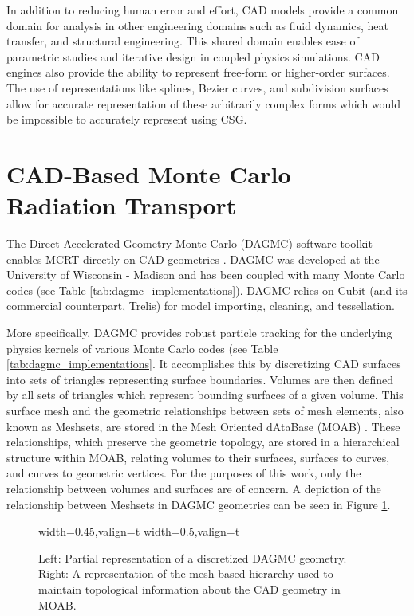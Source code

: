 In addition to reducing human error and effort, CAD models provide a common
domain for analysis in other engineering domains such as fluid dynamics, heat
transfer, and structural engineering. This shared domain enables ease of
parametric studies and iterative design in coupled physics simulations. CAD
engines also provide the ability to represent free-form or higher-order
surfaces. The use of representations like splines, Bezier curves, and
subdivision surfaces allow for accurate representation of these arbitrarily
complex forms which would be impossible to accurately represent using CSG.

\section{CAD-Based Monte Carlo Radiation Transport}

The Direct Accelerated Geometry Monte Carlo (DAGMC) software toolkit enables
MCRT directly on CAD geometries \cite{Tautges_2009}. DAGMC was developed at the
University of Wisconsin - Madison and has been coupled with many Monte Carlo
codes (see Table \ref{tab:dagmc_implementations}). DAGMC relies on
Cubit\cite{Blacker_1994} (and its commercial counterpart,
Trelis\cite{Trelis_2018}) for model importing, cleaning, and tessellation.

More specifically, DAGMC provides robust particle tracking for the underlying
physics kernels of various Monte Carlo codes (see Table
\ref{tab:dagmc_implementations}. It accomplishes this by discretizing CAD
surfaces into sets of triangles representing surface boundaries. Volumes are
then defined by all sets of triangles which represent bounding surfaces of a
given volume. This surface mesh and the geometric relationships between sets of
mesh elements, also known as Meshsets, are stored in the Mesh Oriented dAtaBase
(MOAB) \cite{Tautges_2004}. These relationships, which preserve the geometric
topology, are stored in a hierarchical structure within MOAB, relating volumes
to their surfaces, surfaces to curves, and curves to geometric vertices. For the
purposes of this work, only the relationship between volumes and surfaces are of
concern. A depiction of the relationship between Meshsets in DAGMC geometries
can be seen in Figure \ref{fig:dagmc_geom_example}.

\begin{figure}
  \centering
  {width=0.45\textwidth,valign=t}
  {width=0.5\textwidth,valign=t}
  \caption[The DAGMC data model in MOAB.]{Left: Partial representation of a discretized DAGMC geometry. Right:
    A representation of the mesh-based hierarchy used to maintain topological
    information about the CAD geometry in MOAB.}
  \label{fig:dagmc_geom_example}
\end{figure}

